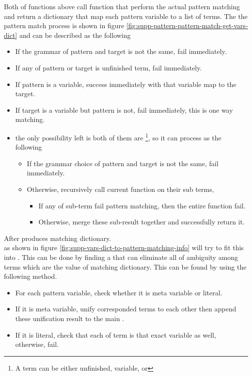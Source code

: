 \documentclass[master.tex]{subfiles}
\begin{document}
\newpage

Both of functions above call function  that
perform the actual pattern matching and return a dictionary that map each
pattern variable to a list of terms. The the pattern match process is shown in
figure \ref{fig:supp-pattern-pattern-match-get-vars-dict} and can be
described as the following
\begin{itemize}
\item If the grammar of pattern and target is not the same, fail immediately.
\item If any of pattern or target is unfinished term, fail immediately.
\item If pattern is a variable, success immediately with that variable
  map to the target.
\item If target is a variable but pattern is not, fail immediately, this is
  one way matching.
\item the only possibility left is both of them are
  \footnote{A term can be either unfinished, variable, or
    }, so it can process as the following
  \begin{itemize}
  \item If the grammar choice of pattern and target is not the same, fail
    immediately.
  \item Otherwise, recursively call current function on their sub terms,
    \begin{itemize}
      \item If any of sub-term fail pattern matching, then the entire function fail.
      \item Otherwise, merge these sub-result together and successfully return it.
    \end{itemize}
  \end{itemize}
\end{itemize}

After  produces matching dictionary. \\
 as shown in figure
\ref{fig:supp-vars-dict-to-pattern-matching-info} will try to fit this into
. This can be done by finding a
 that can eliminate all of ambiguity among terms which
are the value of matching dictionary. This  can be found
by using the following method.
\begin{itemize}
\item For each pattern variable, check whether it is meta variable or literal.
\item If it is meta variable, unify corresponded terms to each other then append
  these unification result to the main .
\item If it is literal, check that each of term is that exact variable as well,
  otherwise, fail.
\end{itemize}
\end{document}
